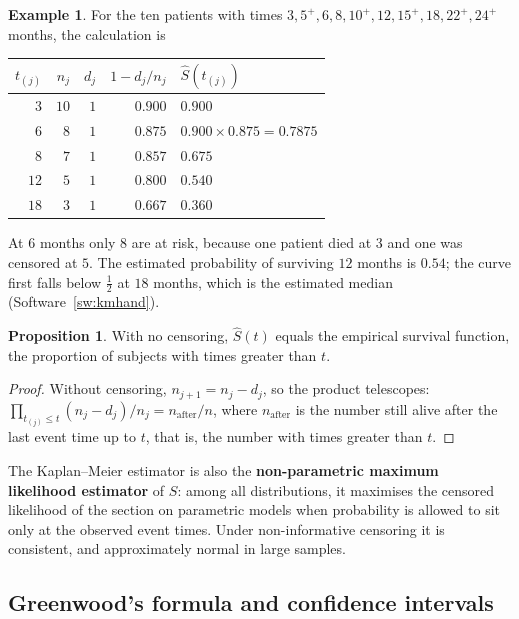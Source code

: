 \documentclass[11pt,a4paper]{article}
\numberwithin{equation}{section}
\theoremstyle{definition}
\newtheorem{exa}[thm]{Example}
\newtheorem{prop}[thm]{Proposition}
\begin{document}
\begin{exa}
\label{ex:kmhand}
For the ten patients with times $3, 5^+, 6, 8, 10^+, 12, 15^+, 18, 22^+, 24^+$ months, the calculation is
\begin{center}
\small
\begin{tabular}{rrrrl}
\hline
$t_{(j)}$ & $n_j$ & $d_j$ & $1 - d_j/n_j$ & $\hat S(t_{(j)})$ \\
\hline
$3$ & $10$ & $1$ & $0.900$ & $0.900$ \\
$6$ & $8$ & $1$ & $0.875$ & $0.900 \times 0.875 = 0.7875$ \\
$8$ & $7$ & $1$ & $0.857$ & $0.675$ \\
$12$ & $5$ & $1$ & $0.800$ & $0.540$ \\
$18$ & $3$ & $1$ & $0.667$ & $0.360$ \\
\hline
\end{tabular}
\end{center}
At $6$ months only $8$ are at risk, because one patient died at $3$ and one was censored at $5$. The estimated probability of surviving $12$ months is $0.54$; the curve first falls below $\frac12$ at $18$ months, which is the estimated median (Software~\ref{sw:kmhand}).
\end{exa}

\begin{prop}
\label{prop:kmempirical}
With no censoring, $\hat S(t)$ equals the empirical survival function, the proportion of subjects with times greater than $t$.
\end{prop}

\begin{proof}
Without censoring, $n_{j + 1} = n_j - d_j$, so the product telescopes: $\prod_{t_{(j)} \leq t}(n_j - d_j)/n_j = n_{\text{after}}/n$, where $n_{\text{after}}$ is the number still alive after the last event time up to $t$, that is, the number with times greater than $t$.
\end{proof}

The Kaplan--Meier estimator is also the \textbf{non-parametric maximum likelihood estimator} of $S$: among all distributions, it maximises the censored likelihood of the section on parametric models when probability is allowed to sit only at the observed event times. Under non-informative censoring it is consistent, and approximately normal in large samples.

\subsection{Greenwood's formula and confidence intervals}
\label{ssec:greenwood}
\end{document}
